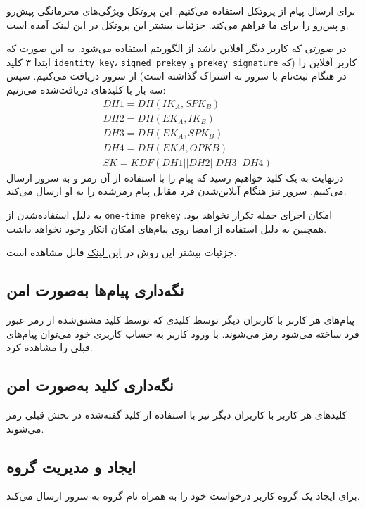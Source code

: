 \documentclass{article}
\begin{document}
برای ارسال پیام از پروتکل  استفاده می‌کنیم.
این پروتکل ویژگی‌های محرمانگی پیش‌رو و پس‌رو را برای ما فراهم می‌کند.
جزئیات بیشتر این پروتکل در \href{https://signal.org/docs/specifications/doubleratchet/}{این لینک} آمده است.

در صورتی که کاربر دیگر آفلاین باشد از الگوریتم  استفاده می‌شود.
به این صورت که ابتدا ۳ کلید \texttt{identity key}، \texttt{signed prekey} و \texttt{prekey signature} کاربر آفلاین را (که در هنگام ثبت‌نام با سرور به اشتراک گذاشته است) از سرور دریافت می‌کنیم.
سپس سه بار با کلیدهای دریافت‌شده  می‌زنیم:
\begin{align*}
	&DH1 = DH(IK_A, SPK_B) \\
	&DH2 = DH(EK_A, IK_B) \\
	&DH3 = DH(EK_A, SPK_B) \\
	&DH4 = DH(EKA, OPKB) \\
	&SK = KDF(DH1 || DH2 || DH3 || DH4)
\end{align*}
درنهایت به یک کلید خواهیم رسید که پیام را با استفاده از آن رمز و به سرور ارسال می‌کنیم.
سرور نیز هنگام آنلاین‌شدن فرد مقابل پیام رمز‌شده را به او ارسال می‌کند.

به دلیل استفاده‌شدن از \texttt{one-time prekey} امکان اجرای حمله تکرار نخواهد بود.
همچنین به دلیل استفاده از امضا روی پیام‌های امکان انکار وجود نخواهد داشت.

جزئیات بیشتر این روش در \href{https://signal.org/docs/specifications/x3dh/#x3dh-parameters}{این لینک} قابل مشاهده است.


\subsection{نگه‌داری پیام‌ها به‌صورت امن}
پیام‌های هر کاربر با کاربران دیگر توسط کلیدی که توسط کلید مشتق‌شده از رمز عبور فرد ساخته می‌شود رمز می‌شوند.
با ورود کاربر به حساب کاربری خود می‌توان پیام‌های قبلی را مشاهده کرد.

\subsection{نگه‌داری کلید به‌صورت امن}
کلیدهای هر کاربر با کاربران دیگر نیز با استفاده از کلید گفته‌شده در بخش قبلی رمز می‌شوند.

\subsection{ایجاد و مدیریت گروه}
برای ایجاد یک گروه کاربر درخواست خود را به همراه نام گروه به سرور ارسال می‌کند.
\end{document}
